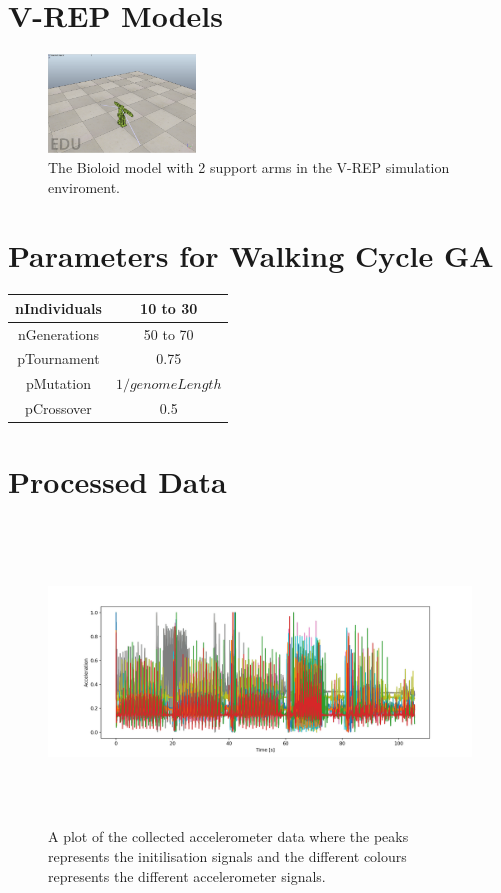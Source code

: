 \section{V-REP Models}
\label{app:model}
\begin{figure}[htbp]
    \centering
    \includegraphics[width=0.35\textwidth]{include/figure/2rods.png}
    \caption{The Bioloid model with 2 support arms in the V-REP simulation enviroment.}
    \label{fig:2rods}
\end{figure}
\section{Parameters for Walking Cycle GA}
\label{app:GAparametersPrimary}
\begin{tabular}{|c|c|}
\hline
nIndividuals & 10 to 30\\
\hline
nGenerations & 50 to 70\\
\hline
pTournament & 0.75\\
\hline
pMutation & $1/genomeLength$\\
\hline
pCrossover & 0.5\\
\hline

\end{tabular}


\section{Processed Data}\label{ProcessedData}

\begin{figure}[htbp]
    \centering
    \includegraphics[width=15cm,height=8cm]
    {include/figure/AllCyc.png}
    \caption{A plot of the collected accelerometer data where the peaks represents the initilisation signals and the different colours represents the different accelerometer signals.}
    \label{fig:AllCyc}
\end{figure}

